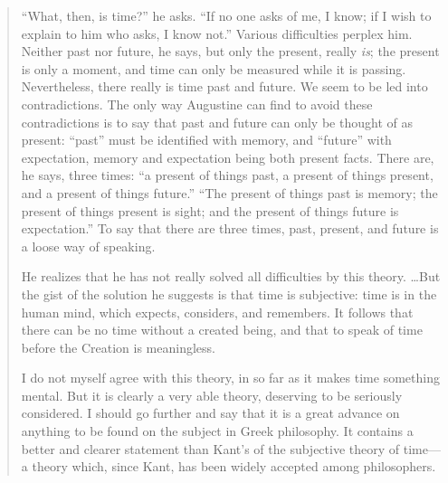 \begin{quotation}
``What, then, is time?'' he asks. ``If no one asks of me, I know; if I wish to explain to him who asks, I know not.'' Various difficulties perplex him. Neither past nor future, he says, but only the present, really \textit{is}; the present is only a moment, and time can only be measured while it is passing. Nevertheless, there really is time past and future. We seem to be led into contradictions. The only way Augustine can find to avoid these contradictions is to say that past and future can only be thought of as present: ``past'' must be identified with memory, and ``future'' with expectation, memory and expectation being both present facts. There are, he says, three times: ``a present of things past, a present of things present, and a present of things future.'' ``The present of things past is memory; the present of things present is sight; and the present of things future is expectation.'' To say that there are three times, past, present, and future is a loose way of speaking.

He realizes that he has not really solved all difficulties by this theory. \ldots But the gist of the solution he suggests is that time is subjective: time is in the human mind, which expects, considers, and remembers. It follows that there can be no time without a created being, and that to speak of time before the Creation is meaningless.

I do not myself agree with this theory, in so far as it makes time something mental. But it is clearly a very able theory, deserving to be seriously considered. I should go further and say that it is a great advance on anything to be found on the subject in Greek philosophy. It contains a better and clearer statement than Kant's of the subjective theory of time---a theory which, since Kant, has been widely accepted among philosophers.
\end{quotation}
